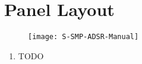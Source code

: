 \documentclass[12pt,letter]{article}
\begin{document}

\clearpage
\section*{Panel Layout}

\begin{figure}[!htp]
\centering
\texttt{[image: S-SMP-ADSR-Manual]}
\end{figure}

\clearpage
\begin{enumerate}
  \item TODO
\end{enumerate}


\clearpage
\renewcommand\refname{References \& Acknowledgments}
\nocite{*}


\end{document}
